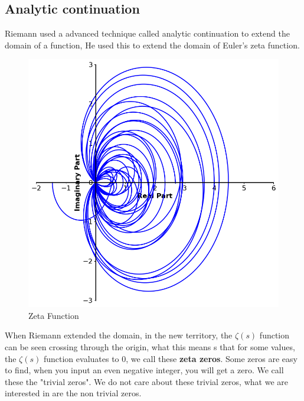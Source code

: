 \documentclass[12pt]{amsart} %
\theoremstyle{definition}
\theoremstyle{remark}
\numberwithin{equation}{section}
\begin{document}

\subsection{Analytic continuation}
Riemann used a advanced technique called analytic continuation to extend the domain of a function, He used this to extend the domain of Euler's zeta function.

\begin{figure}[h!]
    \centering
    \includegraphics[width=0.8\linewidth]{../Images/zetafunction}
    \caption{Zeta Function}
    \label{fig:euler_zeta}
\end{figure}
When Riemann extended the domain, in the new territory, the $\zeta(s)$ function can be seen crossing through the origin, what this means s that for some values, the $\zeta(s)$ function evaluates to 0, we call these \textbf{zeta zeros}. Some zeros are easy to find, when you input an even negative integer, you will get a zero. We call these the "trivial zeros". We do not care about these trivial zeros, what we are interested in are the non trivial zeros.
\end{document}
